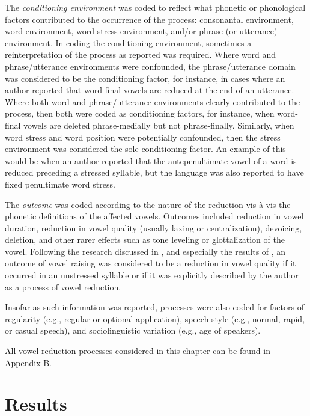   The \textit{conditioning environment} was coded to reflect what phonetic or phonological factors contributed to the occurrence of the process: consonantal environment, word environment, word stress environment, and/or phrase (or utterance) environment. In coding the conditioning environment, sometimes a reinterpretation of the process as reported was required. Where word and phrase/utterance environments were confounded, the phrase/utterance domain was considered to be the conditioning factor, for instance, in cases where an author reported that word-final vowels are reduced at the end of an utterance. Where both word and phrase/utterance environments clearly contributed to the process, then both were coded as conditioning factors, for instance, when word-final vowels are deleted phrase-medially but not phrase-finally. Similarly, when word stress and word position were potentially confounded, then the stress environment was considered the sole conditioning factor. An example of this would be when an author reported that the antepenultimate vowel of a word is reduced preceding a stressed syllable, but the language was also reported to have fixed penultimate word stress.

  The \textit{outcome} was coded according to the nature of the reduction vis-à-vis the phonetic definitions of the affected vowels. Outcomes included reduction in vowel duration, reduction in vowel quality (usually laxing or centralization), devoicing, deletion, and other rarer effects such as tone leveling or glottalization of the vowel. Following the research discussed in , and especially the results of \citet{KapatsinskiEtAl2019}, an outcome of vowel raising was considered to be a reduction in vowel quality if it occurred in an unstressed syllable or if it was explicitly described by the author as a process of vowel reduction.

  Insofar as such information was reported, processes were also coded for factors of regularity (e.g., regular or optional application), speech style (e.g., normal, rapid, or casual speech), and sociolinguistic variation (e.g., age of speakers).

  All vowel reduction processes considered in this chapter can be found in Appendix B.

\section{ Results}\label{sec:6.3}

